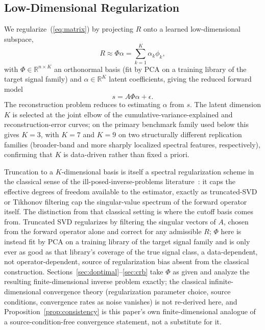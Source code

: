 \documentclass[11pt]{article}
\begin{document}
\subsection{Low-Dimensional Regularization}
\label{sec:latent}

We regularize~(\ref{eq:matrix}) by projecting $R$ onto a learned low-dimensional subspace,
\begin{equation}
R \approx \Phi\alpha = \sum_{k=1}^{K} \alpha_k \phi_k,
\label{eq:latent}
\end{equation}
with $\Phi \in \mathbb{R}^{n\times K}$ an orthonormal basis (fit by PCA on a training library of the target signal family) and $\alpha \in \mathbb{R}^K$ latent coefficients, giving the reduced forward model
\begin{equation}
s = A\Phi\alpha + \epsilon.
\label{eq:reduced}
\end{equation}
The reconstruction problem reduces to estimating $\alpha$ from $s$. The latent dimension $K$ is selected at the joint elbow of the cumulative-variance-explained and reconstruction-error curves; on the primary benchmark family used below this gives $K=3$, with $K=7$ and $K=9$ on two structurally different replication families (broader-band and more sharply localized spectral features, respectively), confirming that $K$ is data-driven rather than fixed a priori.

Truncation to a $K$-dimensional basis is itself a spectral regularization scheme in the classical sense of the ill-posed-inverse-problems literature~\citep{ref39}: it caps the effective degrees of freedom available to the estimator, exactly as truncated-SVD or Tikhonov filtering cap the singular-value spectrum of the forward operator itself. The distinction from that classical setting is where the cutoff basis comes from. Truncated SVD regularizes by filtering the singular vectors of $A$, chosen from the forward operator alone and correct for any admissible $R$; $\Phi$ here is instead fit by PCA on a training library of the target signal family and is only ever as good as that library's coverage of the true signal class, a data-dependent, not operator-dependent, source of regularization bias absent from the classical construction. Sections~\ref{sec:doptimal}--\ref{sec:crb} take $\Phi$ as given and analyze the resulting finite-dimensional inverse problem exactly; the classical infinite-dimensional convergence theory (regularization parameter choice, source conditions, convergence rates as noise vanishes) is not re-derived here, and Proposition~\ref{prop:consistency} is this paper's own finite-dimensional analogue of a source-condition-free convergence statement, not a substitute for it.
\end{document}
